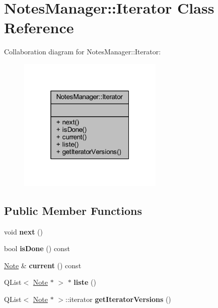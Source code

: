 \hypertarget{class_notes_manager_1_1_iterator}{}\section{Notes\+Manager\+:\+:Iterator Class Reference}
\label{class_notes_manager_1_1_iterator}


Collaboration diagram for Notes\+Manager\+:\+:Iterator\+:
\nopagebreak
\begin{figure}[H]
\begin{center}
\leavevmode
\includegraphics[width=196pt]{class_notes_manager_1_1_iterator__coll__graph}
\end{center}
\end{figure}
\subsection*{Public Member Functions}
\begin{DoxyCompactItemize}
\item 
\mbox{\label{class_notes_manager_1_1_iterator_a1a79699fe56e691c3f1c72eb46703fc6}} 
void {\bfseries next} ()
\item 
\mbox{\label{class_notes_manager_1_1_iterator_ab9afd283687410c5591f97881ac17b29}} 
bool {\bfseries is\+Done} () const
\item 
\mbox{\label{class_notes_manager_1_1_iterator_aaf695d1b7faf4afa9a36115f5e9d3547}} 
\hyperlink{class_note}{Note} \& {\bfseries current} () const
\item 
\mbox{\label{class_notes_manager_1_1_iterator_ab64667e5cf5e2285761c6eaa12797a83}} 
Q\+List$<$ \hyperlink{class_note}{Note} $\ast$ $>$ $\ast$ {\bfseries liste} ()
\item 
\mbox{\label{class_notes_manager_1_1_iterator_ab0cfae90dcf5788e37f4bf84f5c58093}} 
Q\+List$<$ \hyperlink{class_note}{Note} $\ast$ $>$\+::iterator {\bfseries get\+Iterator\+Versions} ()
\end{DoxyCompactItemize}
